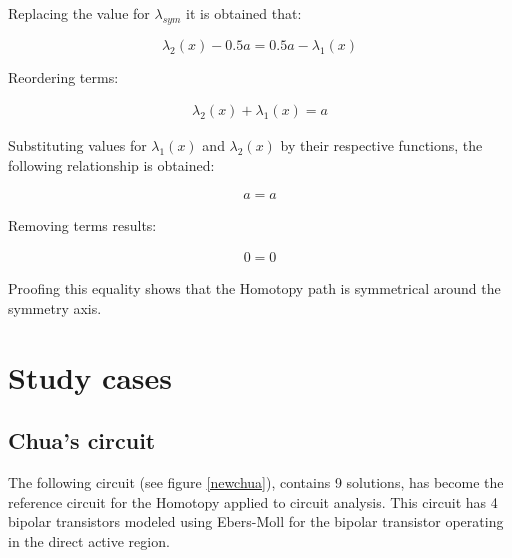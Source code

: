\documentclass[conference,letterpaper,onecolumn]{IEEEtran}
\begin{document}
Replacing the value for $\lambda_{sym}$ it is obtained that:

\begin{displaymath}
\lambda_2(x)-0.5a=0.5a-\lambda_1(x)
\end{displaymath}

Reordering terms:

\begin{displaymath}
\begin{array}{l}
\lambda_2(x)+\lambda_1(x)=a
\end{array}
\end{displaymath}

Substituting values for $\lambda_1(x)$ and $\lambda_2(x)$ by their respective functions, the following relationship is obtained:

\begin{displaymath}
\begin{array}{l}
a=a
\end{array}
\end{displaymath}

Removing terms results:

\begin{displaymath}
\begin{array}{c}
0=0
\end{array}
\end{displaymath}

Proofing this equality shows that the Homotopy path is symmetrical around the symmetry axis.


\section{Study cases}


\subsection{Chua's circuit}

The following circuit \cite{homo_chua} (see figure \ref{newchua}), contains 9 solutions, has become the reference circuit for the Homotopy applied to circuit analysis. This circuit has 4 bipolar transistors modeled using Ebers-Moll for the bipolar transistor operating in the direct active region.
\end{document}
